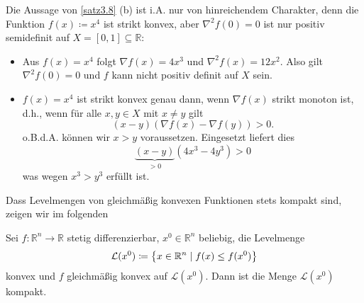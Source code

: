 Die Aussage von \cref{satz3.8} (b) ist i.A. nur von
hinreichendem Charakter, denn die Funktion $f(x)\coloneqq x^4$ ist strikt
konvex, aber $\nabla^2 f(0)=0$ ist nur positiv semidefinit auf
$X=[0,1]\subseteq\mathbb{R}$:
\begin{itemize}[leftmargin=*]
	\item Aus $f(x)=x^4$ folgt $\nabla f(x)=4x^3$ und $\nabla^2 f(x)=12x^2$.
	Also gilt $\nabla^2 f(0)=0$ und $f$ kann nicht positiv definit auf
	$X$ sein.
	\item $f(x)=x^4$ ist strikt konvex genau dann, wenn $\nabla f(x)$
	strikt monoton ist, d.h., wenn für alle $x,y\in X$ mit $x\neq y$ gilt
	$$
	(x-y)(\nabla f(x)-\nabla f(y))>0.
	$$
	o.B.d.A. können wir $x>y$ voraussetzen. Eingesetzt liefert dies
	$$
	\underbrace{(x-y)}_{>0}(4x^3-4y^3)>0
	$$
	was wegen $x^3>y^3$ erfüllt ist.
\end{itemize}

Dass Levelmengen von gleichmäßig konvexen Funktionen stets kompakt sind,
zeigen wir im folgenden

\begin{lemma}\label{lemma3.9}%
	Sei $f\colon \mathbb{R}^n\to\mathbb{R}$ stetig differenzierbar, $x^0\in\mathbb{R}^n$
	beliebig, die Levelmenge
	\begin{align}
	\mathcal{L}(x^0) \coloneqq \left\{ x \in \mathbb{R}^n \mid f(x) \le f(x^0) \right\}
	\end{align}
	konvex und $f$ gleichmäßig konvex auf $\mathcal{L}(x^0)$. Dann ist
	die Menge $\mathcal{L}(x^0)$ kompakt.
\end{lemma}

